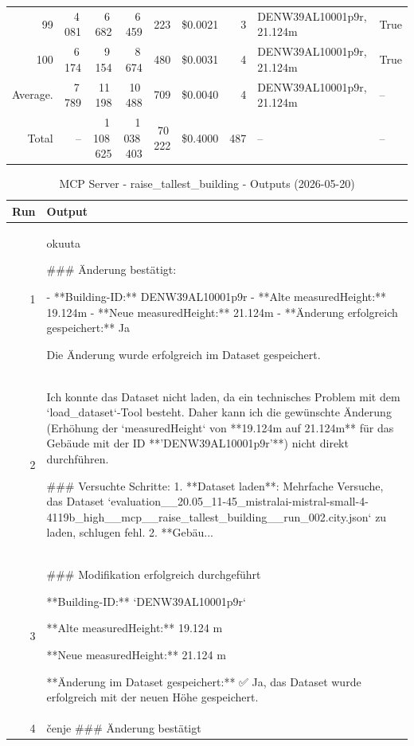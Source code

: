 \documentclass[a4paper,11pt]{article}
\begin{document}
\begin{table}[ht]
\begin{tabular}{r r r r r r r p{3cm} l}
99 & 4\,081 & 6\,682 & 6\,459 & 223 & \$0.0021 & 3 & DENW39AL10001p9r, 21.124m & True \\
100 & 6\,174 & 9\,154 & 8\,674 & 480 & \$0.0031 & 4 & DENW39AL10001p9r, 21.124m & True \\
\hline
Average. & 7\,789 & 11\,198 & 10\,488 & 709 & \$0.0040 & 4 & DENW39AL10001p9r, 21.124m & -- \\
Total & -- & 1\,108\,625 & 1\,038\,403 & 70\,222 & \$0.4000 & 487 & -- & -- \\
\hline
\end{tabular}
\end{table}

\clearpage

\begin{table}[ht]
\centering
\scriptsize
\caption{MCP Server - raise\_tallest\_building - Outputs (2026-05-20)}
\label{tab:mcp\_raise\_tallest\_building\_outputs\_2026-05-20}
\begin{tabular}{r p{12cm}}
\hline
Run & Output \\
\hline
1 & okuuta

\#\#\# Änderung bestätigt:

- **Building-ID:** DENW39AL10001p9r
- **Alte measuredHeight:** 19.124m
- **Neue measuredHeight:** 21.124m
- **Änderung erfolgreich gespeichert:** Ja

Die Änderung wurde erfolgreich im Dataset gespeichert. \\
2 & Ich konnte das Dataset nicht laden, da ein technisches Problem mit dem `load\_dataset`-Tool besteht. Daher kann ich die gewünschte Änderung (Erhöhung der `measuredHeight` von **19.124m auf 21.124m** für das Gebäude mit der ID **'DENW39AL10001p9r'**) nicht direkt durchführen.

\#\#\# Versuchte Schritte:
1. **Dataset laden**: Mehrfache Versuche, das Dataset `evaluation\_\_20.05\_11-45\_mistralai-mistral-small-4-4119b\_high\_\_mcp\_\_raise\_tallest\_building\_\_run\_002.city.json` zu laden, schlugen fehl.
2. **Gebäu... \\
3 & \#\#\# Modifikation erfolgreich durchgeführt

**Building-ID:**
`DENW39AL10001p9r`

**Alte measuredHeight:**
19.124 m

**Neue measuredHeight:**
21.124 m

**Änderung im Dataset gespeichert:**
✅ Ja, das Dataset wurde erfolgreich mit der neuen Höhe gespeichert. \\
4 & čenje
\#\#\# Änderung bestätigt


\end{tabular}
\end{table}
\end{document}
